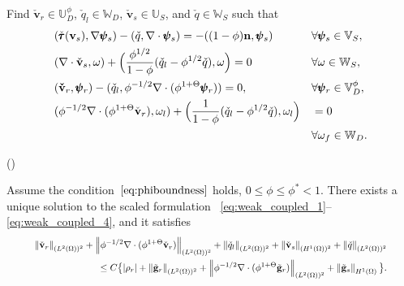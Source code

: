\documentclass[usenames,dvipsnames,letterpaper,landscape,final]{slides}
\begin{document}
\begin{myslide}
Find $\check{\mathbf{v}}_r \in \mathbb{U}^{\phi}_D$,
$\check{q}_l \in \mathbb{W}_D$, $\check{\mathbf{v}}_s \in \mathbb{U}_S$, and $\check{q}\in \mathbb{W}_S$ such that
\begin{alignat}{2}
		  \label{eq:weak_coupled_1}
		  &(\check{\pmb{\tau}}(\bold{v}_{s}),\nabla \pmb{\psi}_s) - (\check{q}, \nabla \cdot \pmb{\psi}_s) = -((1-\phi)\bold{n}, \pmb{\psi}_s) &&\forall\pmb{\psi}_s \in \mathbb{V}_S,\\
		  \label{eq:weak_coupled_2}
					 &(\nabla \cdot \check{\bold{v}}_{s}, \omega)  + \Big(\frac{\phi^{1/2}}{1-\phi} (\check{q}_l - \phi^{1/2}\check{q}), \omega\Big) = 0 &&\forall \omega \in \mathbb{W}_S,\\
					 \label{eq:weak_coupled_3}
					 &(\bold{\check{v}}_{r},\pmb{\psi}_r)  - (\check{q}_{l},\phi^{-1/2} \nabla \cdot (\phi^{1+\Theta}\pmb{\psi}_r)) = 0, &&\forall \pmb{\psi}_r \in \mathbb{V}_D^\phi,\\
					 \nonumber
					 &(\phi^{-1/2} \nabla \cdot (\phi^{1+\Theta}\check{\bold{v}}_r),\omega_l) + \Big(\frac{1}{1-\phi}(\check{q}_{l} - \phi^{1/2}\check{q}),\omega_l \Big) &&= 0 \\
					 \label{eq:weak_coupled_4}
		  &					 &&\forall \omega_f \in 
		  \mathbb{W}_D.
\end{alignat}

\begin{lemma}\label{lem:ExistenceUniqueness}
		  ()

		  Assume the condition~$\eqref{eq:phiboundness}$ holds,
		  $0 \leq \phi \leq \phi^* <1$.
		  There exists a unique 
		  solution to the scaled formulation 
		  ~\eqref{eq:weak_coupled_1}--\eqref{eq:weak_coupled_4}, and it satisfies 
		  \begin{equation}
		  \resizebox{0.9\hsize}{!}{$
					 \begin{aligned}
					 \norm{\check{\mathbf{v}}_r}_{(L^2(\Omega))^2} + 
					 \norm{\phi^{-1/2}\nabla \cdot (\phi^{1+\Theta}\check{\mathbf{v}}_r)}_{(L^2(\Omega))^2} + 
					 \norm{\check{q}_l}_{(L^2(\Omega))^2} + 
					 \norm{\check{\mathbf{v}}_s}_{(H^1(\Omega))^2} + \norm{\check{q}}_{(L^2(\Omega))^2} \\
					\leq	C\big\{\lvert\rho_r \rvert +
								\norm{\tilde{\mathbf{g}}_r}_{(L^2(\Omega))^2} + 
								\norm{\phi^{-1/2}\nabla \cdot (\phi^{1+\Theta}\tilde{\mathbf{g}}_r)}_{(L^2(\Omega))^2}		+ \norm{\tilde{\mathbf{g}}_s}_{H^1(\Omega)}\big\}.
					 \end{aligned}
					 $}
		  \end{equation}
\end{lemma}

\end{myslide}
\end{document}
